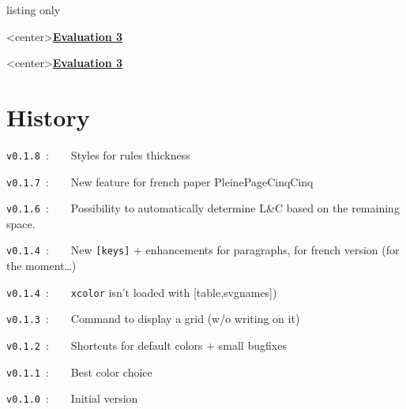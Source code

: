 \documentclass[a4paper]{article}
\begin{document}
\begin{PresentationCode}{listing only}
\begin{PleinePageRuled}[NumLignes]
	\LignePapierRuled[Echelle=1.25,Ligne=2,Couleur=red]<center>{\underline{\cursive\bfseries Evaluation 3}}
	\ParagraphePapierRuled[Ligne=9]{\cursive\lipsum[1]}
\end{PleinePageRuled}
\end{PresentationCode}

\pagebreak

\thispagestyle{empty}

\begin{PleinePageRuled}
	\LignePapierRuled[Echelle=1.25,Ligne=2,Couleur=red]<center>{\underline{\cursive\bfseries Evaluation 3}}
	\ParagraphePapierRuled[Ligne=9]{\cursive\lipsum[1]}
\end{PleinePageRuled}

\pagebreak

\part*{History}

\verb|v0.1.8|~:~~~~Styles for rules thickness

\verb|v0.1.7|~:~~~~New feature for french paper \textsf{PleinePageCinqCinq}

\verb|v0.1.6|~:~~~~Possibility to automatically determine L\&C based on the remaining space.

\verb|v0.1.4|~:~~~~New \texttt{[keys]} + enhancements for paragraphs, for french version (for the moment\dots)

\verb|v0.1.4|~:~~~~\texttt{xcolor} isn't loaded with \textsf{[table,svgnames]})

\verb|v0.1.3|~:~~~~Command to display a grid (w/o writing on it)

\verb|v0.1.2|~:~~~~Shortcuts for default colors + small bugfixes

\verb|v0.1.1|~:~~~~Best color choice

\verb|v0.1.0|~:~~~~Initial version
\end{document}
